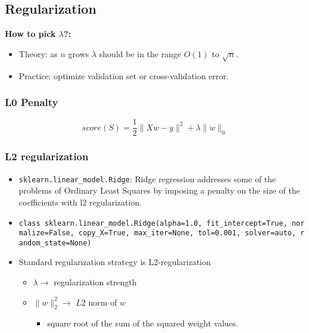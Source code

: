 \documentclass[]{article}
\providecommand{\tightlist}{%
  \setlength{\itemsep}{0pt}\setlength{\parskip}{0pt}}
\begin{document}
\hypertarget{regularization}{%
\subsection{Regularization}\label{regularization}}

\textbf{How to pick \(\lambda\)?:}

\begin{itemize}
\tightlist
\item
  Theory: as \(n\) grows \(\lambda\) should be in the range \(O(1)\) to
  \(\sqrt{n}\).
\item
  Practice: optimize validation set or cross-validation error.
\end{itemize}

\hypertarget{l0-penalty}{%
\subsubsection{L0 Penalty}\label{l0-penalty}}

\[ score(S) = \frac{1}{2}\lVert{Xw -y}\rVert^2 + \lambda \lVert w\rVert_0\]

\hypertarget{l2-regularization}{%
\subsubsection{L2 regularization}\label{l2-regularization}}

\begin{itemize}
\item
  \texttt{sklearn.linear\_model.Ridge}: Ridge regression addresses some
  of the problems of Ordinary Least Squares by imposing a penalty on the
  size of the coefficients with l2 regularization.
\item
  \texttt{class\ sklearn.linear\_model.Ridge(alpha=1.0,\ fit\_intercept=True,\ normalize=False,\ copy\_X=True,\ max\_iter=None,\ tol=0.001,\ solver=\textquotesingle{}auto\textquotesingle{},\ random\_state=None)}
\item
  Standard regularization strategy is L2-regularization

  \begin{itemize}
  \tightlist
  \item
    \(\lambda \rightarrow\) regularization strength
  \item
    \(\lVert w\rVert_2^2 \rightarrow\) \(L2\) norm of \(w\)

    \begin{itemize}
    \tightlist
    \item
      square root of the sum of the squared weight values.
    \end{itemize}
  \end{itemize}
\end{itemize}
\end{document}
